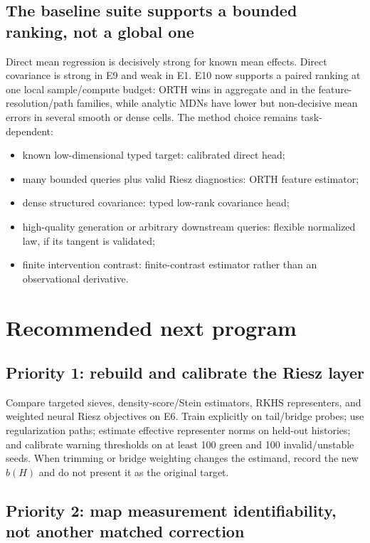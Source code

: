 \documentclass[11pt]{article}
\begin{document}
\subsection{The baseline suite supports a bounded ranking, not a global one}

Direct mean regression is decisively strong for known mean effects.  Direct covariance is strong in E9 and weak in E1.  E10 now supports a paired ranking at one local sample/compute budget: ORTH wins in aggregate and in the feature-resolution/path families, while analytic MDNs have lower but non-decisive mean errors in several smooth or dense cells.  The method choice remains task-dependent:
\begin{itemize}
\item known low-dimensional typed target: calibrated direct head;
\item many bounded queries plus valid Riesz diagnostics: ORTH feature estimator;
\item dense structured covariance: typed low-rank covariance head;
\item high-quality generation or arbitrary downstream queries: flexible normalized law, if its tangent is validated;
\item finite intervention contrast: finite-contrast estimator rather than an observational derivative.
\end{itemize}

\section{Recommended next program}

\subsection*{Priority 1: rebuild and calibrate the Riesz layer}

Compare targeted sieves, density-score/Stein estimators, RKHS representers, and weighted neural Riesz objectives on E6.  Train explicitly on tail/bridge probes; use regularization paths; estimate effective representer norms on held-out histories; and calibrate warning thresholds on at least 100 green and 100 invalid/unstable seeds.  When trimming or bridge weighting changes the estimand, record the new $b(H)$ and do not present it as the original target.

\subsection*{Priority 2: map measurement identifiability, not another matched correction}
\end{document}
